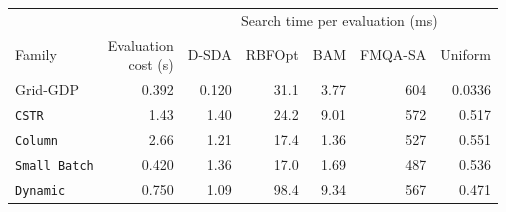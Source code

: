 \begin{tabular}{lrrrrrr}\toprule
 & & \multicolumn{5}{c}{Search time per evaluation (ms)}\\\cmidrule(l){3-7}
Family & \makecell{Evaluation\\cost (s)} & D-SDA & RBFOpt & BAM & FMQA-SA & Uniform\\\midrule
Grid-GDP & 0.392 & 0.120 & 31.1 & 3.77 & 604 & 0.0336 \\
\texttt{CSTR} & 1.43 & 1.40 & 24.2 & 9.01 & 572 & 0.517 \\
\texttt{Column} & 2.66 & 1.21 & 17.4 & 1.36 & 527 & 0.551 \\
\texttt{Small Batch} & 0.420 & 1.36 & 17.0 & 1.69 & 487 & 0.536 \\
\texttt{Dynamic} & 0.750 & 1.09 & 98.4 & 9.34 & 567 & 0.471 \\
\bottomrule\end{tabular}

